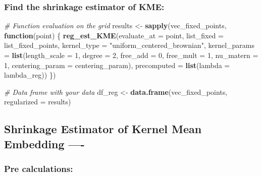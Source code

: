 \documentclass[
]{article}
\newenvironment{Shaded}{\begin{snugshade}}{\end{snugshade}}
\newcommand{\AttributeTok}[1]{\textcolor[rgb]{0.13,0.29,0.53}{#1}}
\newcommand{\CommentTok}[1]{\textcolor[rgb]{0.56,0.35,0.01}{\textit{#1}}}
\newcommand{\ControlFlowTok}[1]{\textcolor[rgb]{0.13,0.29,0.53}{\textbf{#1}}}
\newcommand{\DecValTok}[1]{\textcolor[rgb]{0.00,0.00,0.81}{#1}}
\newcommand{\FunctionTok}[1]{\textcolor[rgb]{0.13,0.29,0.53}{\textbf{#1}}}
\newcommand{\NormalTok}[1]{#1}
\newcommand{\OtherTok}[1]{\textcolor[rgb]{0.56,0.35,0.01}{#1}}
\newcommand{\StringTok}[1]{\textcolor[rgb]{0.31,0.60,0.02}{#1}}
\begin{document}
\subsubsection{Find the shrinkage estimator of
KME:}\label{find-the-shrinkage-estimator-of-kme}

\begin{Shaded}
\begin{Highlighting}[]
\CommentTok{\# Function evaluation on the grid}
\NormalTok{results }\OtherTok{\textless{}{-}} \FunctionTok{sapply}\NormalTok{(vec\_fixed\_points, }\ControlFlowTok{function}\NormalTok{(point) \{}
  \FunctionTok{reg\_est\_KME}\NormalTok{(}\AttributeTok{evaluate\_at =}\NormalTok{ point,}
              \AttributeTok{list\_fixed =}\NormalTok{ list\_fixed\_points,}
              \AttributeTok{kernel\_type =} \StringTok{"uniform\_centered\_brownian"}\NormalTok{,}
              \AttributeTok{kernel\_params =} \FunctionTok{list}\NormalTok{(}\AttributeTok{length\_scale =} \DecValTok{1}\NormalTok{, }\AttributeTok{degree =} \DecValTok{2}\NormalTok{, }\AttributeTok{free\_add =} \DecValTok{0}\NormalTok{, }\AttributeTok{free\_mult =} \DecValTok{1}\NormalTok{, }\AttributeTok{nu\_matern =} \DecValTok{1}\NormalTok{, }\AttributeTok{centering\_param =}\NormalTok{ centering\_param),}
              \AttributeTok{precomputed =} \FunctionTok{list}\NormalTok{(}\AttributeTok{lambda =}\NormalTok{ lambda\_reg))}
\NormalTok{\})}


\CommentTok{\# Data frame with your data}
\NormalTok{df\_reg }\OtherTok{\textless{}{-}} \FunctionTok{data.frame}\NormalTok{(vec\_fixed\_points, }\AttributeTok{regularized =}\NormalTok{ results)}
\end{Highlighting}
\end{Shaded}

\subsection{Shrinkage Estimator of Kernel Mean Embedding
----}\label{shrinkage-estimator-of-kernel-mean-embedding--}

\subsubsection{Pre calculations:}\label{pre-calculations}
\end{document}
